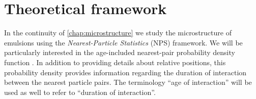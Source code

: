 \section{Theoretical framework}
\label{sec:Theory}

In the continuity of \ref{chap:microstructure} \citep{fintzi2024buoyancy} we study the microstructure of emulsions using the \textit{Nearest-Particle Statistics} (NPS) framework. 
We will be particularly interested in the age-included nearest-pair probability density function \citep{zhang2021ensemble}. 
In addition to providing details about relative positions, this probability density provides information regarding the duration of interaction between the nearest particle pairs. 
The terminology ``age of interaction'' will be used as well to refer to ``duration of interaction''.  

